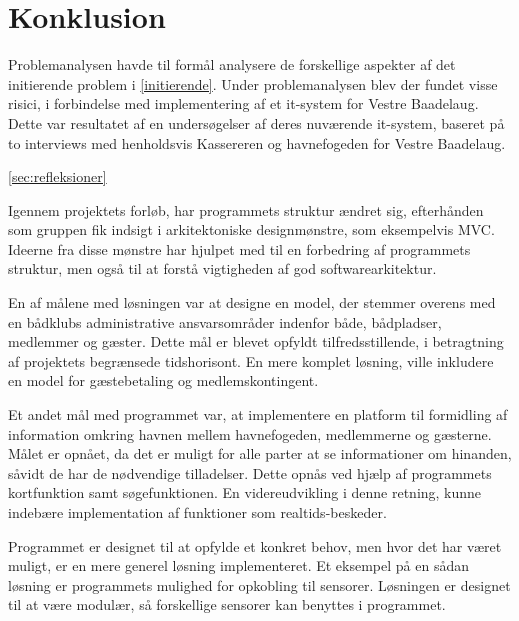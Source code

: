 \chapter{Konklusion}
\label{cha:konklusion}

Problemanalysen havde til formål analysere de forskellige aspekter af det initierende problem i \cref{initierende}.  
Under problemanalysen blev der fundet visse risici, i forbindelse med implementering af et it-system for Vestre Baadelaug.
Dette var resultatet af en undersøgelser af deres nuværende it-system, baseret på to interviews med henholdsvis Kassereren og havnefogeden for Vestre Baadelaug.

\cref{sec:refleksioner} 

Igennem projektets forløb, har programmets struktur ændret sig, efterhånden som gruppen fik indsigt i arkitektoniske designmønstre, som eksempelvis MVC. Ideerne fra disse mønstre har hjulpet med til en forbedring af programmets struktur, men også til at forstå vigtigheden af god softwarearkitektur.

En af målene med løsningen var at designe en model, der stemmer overens med en bådklubs administrative ansvarsområder indenfor både, bådpladser, medlemmer og gæster. Dette mål er blevet opfyldt tilfredsstillende, i betragtning af projektets begrænsede tidshorisont. En mere komplet løsning, ville inkludere en model for gæstebetaling og medlemskontingent.

Et andet mål med programmet var, at implementere en platform til formidling af information omkring havnen mellem havnefogeden, medlemmerne og gæsterne. Målet er opnået, da det er muligt for alle parter at se informationer om hinanden, såvidt de har de nødvendige tilladelser. Dette opnås ved hjælp af programmets kortfunktion samt søgefunktionen. En videreudvikling i denne retning, kunne indebære implementation af funktioner som realtids-beskeder.

Programmet er designet til at opfylde et konkret behov, men hvor det har været muligt, er en mere generel løsning implementeret. Et eksempel på en sådan løsning er programmets mulighed for opkobling til sensorer. Løsningen er designet til at være modulær, så forskellige sensorer kan benyttes i programmet.

